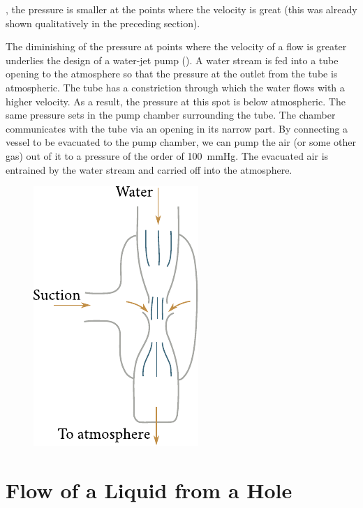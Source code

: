 \noindent
\ie, the pressure is smaller at the points where the velocity is great (this was already shown qualitatively in the preceding section).

The diminishing of the pressure at points where the velocity of a flow is greater underlies the design of a water-jet pump (). A water stream is fed into a tube opening to the atmosphere so that the pressure at the outlet from the tube is atmospheric. The tube has a constriction through which the water flows with a higher velocity. As a result, the pressure at this spot is below atmospheric. The same pressure sets in the pump chamber surrounding the tube. The chamber communicates with the tube via an opening in its narrow part. By connecting a vessel to be evacuated to the pump chamber, we can pump the air (or some other gas) out of it to a pressure of the order of \SI{100}{\mmHg}. The evacuated air is entrained by the water stream and carried off into the atmosphere.

\begin{figure}[t]
	\begin{center}
		\includegraphics[scale=0.95]{figures/ch_09/fig_9_6.pdf}
		\caption[]{}
		\label{fig:9_6}
	\end{center}
	\vspace{-0.8cm}
\end{figure}

\section{Flow of a Liquid from a Hole}\label{sec:9_3}

